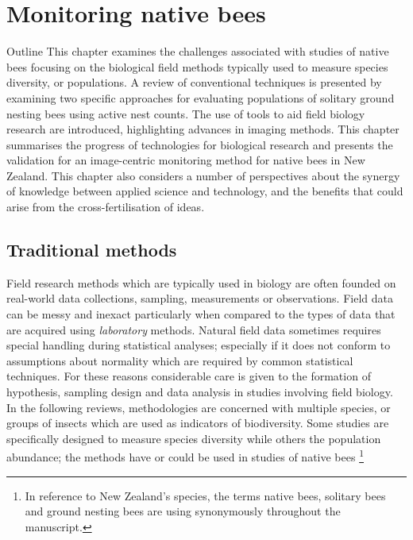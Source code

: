 \chapter{Monitoring native bees}\label{sec:monitoring-native-bees}
\begin{remark}{Outline}
This chapter examines the challenges associated with studies of native bees focusing on the biological field methods typically used to measure species diversity, or populations. A review of conventional techniques is presented by examining two specific approaches for evaluating populations of solitary ground nesting bees using active nest counts.
The use of tools to aid field biology research are introduced, highlighting advances in imaging methods. This chapter summarises the progress of technologies for biological research and presents the validation for an image-centric monitoring method for native bees in New Zealand. This chapter also considers a number of perspectives about the synergy of knowledge between applied science and technology, and the benefits that could arise from the cross-fertilisation of ideas.
\end{remark}

\section{Traditional methods}\label{sec:traditional-methods}
Field research methods which are typically used in biology are often founded on real-world data collections, sampling, measurements or observations. {Field} data can be messy and inexact particularly when compared to the types of data that are acquired using \emph{laboratory} methods. Natural field data sometimes requires special handling  during statistical analyses; especially if it does not conform to assumptions about normality which are required by common statistical techniques. For these reasons considerable care is given to the formation of hypothesis, sampling design and data analysis in studies involving field biology. In the following reviews, methodologies are concerned with multiple species, or groups of insects which are used as indicators of biodiversity. Some studies are specifically designed to measure species diversity while others the population abundance; the methods have or could be used in studies of native bees \footnote{In reference to New Zealand's species, the terms native bees, solitary bees and ground nesting bees are using synonymously throughout the manuscript.}

